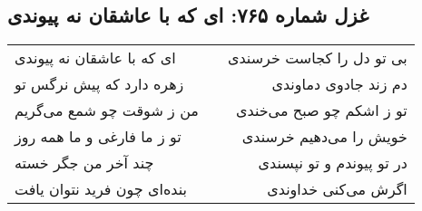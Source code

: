 \begin{center}
\section*{غزل شماره ۷۶۵: ای که با عاشقان نه پیوندی}
\label{sec:765}
\begin{longtable}{l p{0.5cm} r}
ای که با عاشقان نه پیوندی
&&
بی تو دل را کجاست خرسندی
\\
زهره دارد که پیش نرگس تو
&&
دم زند جادوی دماوندی
\\
من ز شوقت چو شمع می‌گریم
&&
تو ز اشکم چو صبح می‌خندی
\\
تو ز ما فارغی و ما همه روز
&&
خویش را می‌دهیم خرسندی
\\
چند آخر من جگر خسته
&&
در تو پیوندم و تو نپسندی
\\
بنده‌ای چون فرید نتوان یافت
&&
اگرش می‌کنی خداوندی
\\
\end{longtable}
\end{center}
